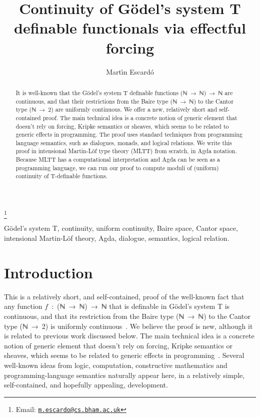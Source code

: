 \documentclass{entcs} \usepackage{prentcsmacro}
\newcommand{\AgdaC}[1]{\mbox{#1}}
\begin{document}
\begin{frontmatter}
  \title{Continuity of G\"odel's system T definable functionals via effectful forcing}
  \author{Mart\'\i{n} Escard\'o}
  \address{School of Computer Science\\ University of Birmingham \\
    Birmingham, England} \thanks[myemail]{Email: \href{mailto:m.escardo@cs.bham.ac.uk} {\texttt{\normalshape m.escardo@cs.bham.ac.uk}}}

\begin{abstract} 

   It is well-known that the Gödel's system T definable functions
   \AgdaC{(ℕ → ℕ) → ℕ} are continuous, and that their restrictions
   from the Baire type \AgdaC{(ℕ → ℕ)} to the Cantor type \AgdaC{(ℕ →
   2)} are uniformly continuous. We offer a new, relatively short and
   self-contained proof. The main technical idea is a concrete notion
   of generic element that doesn't rely on forcing, Kripke semantics
   or sheaves, which seems to be related to generic effects in
   programming.  The proof uses standard techniques from programming
   language semantics, such as dialogues, monads, and logical
   relations. We write this proof in intensional Martin-Löf type
   theory (MLTT) from scratch, in Agda notation. Because MLTT has a
   computational interpretation and Agda can be seen as a programming
   language, we can run our proof to compute moduli of (uniform)
   continuity of T-definable functions.

\end{abstract}
\begin{keyword}
   Gödel's system T, continuity, uniform continuity, Baire space,
   Cantor space, intensional Martin-Löf theory, Agda, dialogue,
   semantics, logical relation.
\end{keyword}
\end{frontmatter}

\section{Introduction} \label{formulation}

This is a relatively short, and self-contained, proof of the
well-known fact that any function \AgdaC{$f$ : (ℕ → ℕ) → ℕ} that is
definable in Gödel's system T is continuous, and that its restriction
from the Baire type \AgdaC{(ℕ → ℕ)} to the Cantor type \AgdaC{(ℕ → 2)}
is uniformly continuous~\cite{MR0325352,beeson}. We believe the proof
is new, although it is related to previous work discussed below.  The
main technical idea is a concrete notion of generic element that
doesn't rely on forcing, Kripke semantics or sheaves, which seems to
be related to generic effects in
programming~\cite{Plotkin03algebraicoperations}.  Several well-known
ideas from logic, computation, constructive mathematics and
programming-language semantics naturally appear here, in a relatively
simple, self-contained, and hopefully appealing, development.
\end{document}
